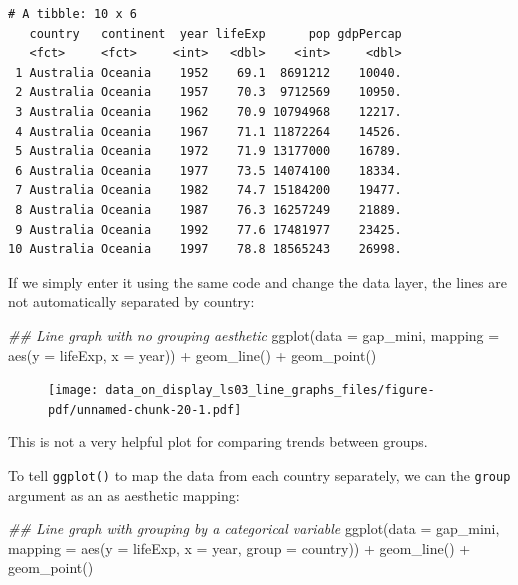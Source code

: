 \documentclass[
  letterpaper,
  DIV=11,
  numbers=noendperiod]{scrreprt}
\newenvironment{Shaded}{\begin{snugshade}}{\end{snugshade}}
\newcommand{\AttributeTok}[1]{\textcolor[rgb]{0.40,0.45,0.13}{#1}}
\newcommand{\DocumentationTok}[1]{\textcolor[rgb]{0.37,0.37,0.37}{\textit{#1}}}
\newcommand{\FunctionTok}[1]{\textcolor[rgb]{0.28,0.35,0.67}{#1}}
\newcommand{\NormalTok}[1]{\textcolor[rgb]{0.00,0.23,0.31}{#1}}
\newcommand{\SpecialCharTok}[1]{\textcolor[rgb]{0.37,0.37,0.37}{#1}}
\begin{document}
\begin{verbatim}
# A tibble: 10 x 6
   country   continent  year lifeExp      pop gdpPercap
   <fct>     <fct>     <int>   <dbl>    <int>     <dbl>
 1 Australia Oceania    1952    69.1  8691212    10040.
 2 Australia Oceania    1957    70.3  9712569    10950.
 3 Australia Oceania    1962    70.9 10794968    12217.
 4 Australia Oceania    1967    71.1 11872264    14526.
 5 Australia Oceania    1972    71.9 13177000    16789.
 6 Australia Oceania    1977    73.5 14074100    18334.
 7 Australia Oceania    1982    74.7 15184200    19477.
 8 Australia Oceania    1987    76.3 16257249    21889.
 9 Australia Oceania    1992    77.6 17481977    23425.
10 Australia Oceania    1997    78.8 18565243    26998.
\end{verbatim}

If we simply enter it using the same code and change the data layer, the
lines are not automatically separated by country:

\begin{Shaded}
\begin{Highlighting}[]
\DocumentationTok{\#\# Line graph with no grouping aesthetic}
\FunctionTok{ggplot}\NormalTok{(}\AttributeTok{data =}\NormalTok{ gap\_mini, }
       \AttributeTok{mapping =} \FunctionTok{aes}\NormalTok{(}\AttributeTok{y =}\NormalTok{ lifeExp, }
                     \AttributeTok{x =}\NormalTok{ year)) }\SpecialCharTok{+}
  \FunctionTok{geom\_line}\NormalTok{() }\SpecialCharTok{+}
  \FunctionTok{geom\_point}\NormalTok{()}
\end{Highlighting}
\end{Shaded}

\begin{figure}[H]

{\centering \texttt{[image: data\_on\_display\_ls03\_line\_graphs\_files/figure-pdf/unnamed-chunk-20-1.pdf]}

}

\end{figure}

This is not a very helpful plot for comparing trends between groups.

To tell \texttt{ggplot()} to map the data from each country separately,
we can the \texttt{group} argument as an as aesthetic mapping:

\begin{Shaded}
\begin{Highlighting}[]
\DocumentationTok{\#\# Line graph with grouping by a categorical variable}
\FunctionTok{ggplot}\NormalTok{(}\AttributeTok{data =}\NormalTok{ gap\_mini, }
       \AttributeTok{mapping =} \FunctionTok{aes}\NormalTok{(}\AttributeTok{y =}\NormalTok{ lifeExp,}
                     \AttributeTok{x =}\NormalTok{ year, }
                     \AttributeTok{group =}\NormalTok{ country)) }\SpecialCharTok{+}
  \FunctionTok{geom\_line}\NormalTok{() }\SpecialCharTok{+}
  \FunctionTok{geom\_point}\NormalTok{()}
\end{Highlighting}
\end{Shaded}
\end{document}
